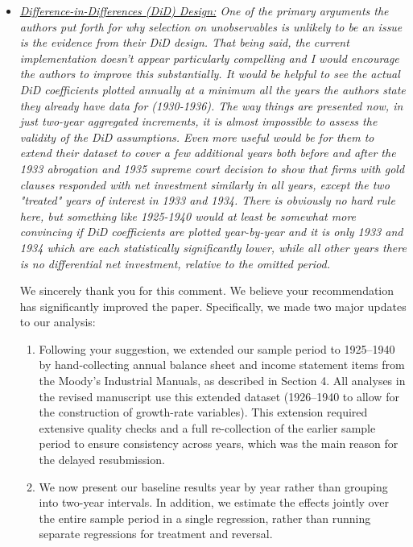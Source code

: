 \begin{itemize}
    \item[\textit{\textcolor{red!60!black}{b.}}] \textit{\textcolor{red!60!black}{
    \underline{Difference-in-Differences (DiD) Design:} 
    One of the primary arguments the authors put forth for why selection on unobservables is unlikely to be an issue is the evidence from their DiD design. That being said, the current implementation doesn't appear particularly compelling and I would encourage the authors to improve this substantially. It would be helpful to see the actual DiD coefficients plotted annually at a minimum all the years the authors state they already have data for (1930-1936). The way things are presented now, in just two-year aggregated increments, it is almost impossible to assess the validity of the DiD assumptions. Even more useful would be for them to extend their dataset to cover a few additional years both before and after the 1933 abrogation and 1935 supreme court decision to show that firms with gold clauses responded with net investment similarly in all years, except the two "treated" years of interest in 1933 and 1934. There is obviously no hard rule here, but something like 1925-1940 would at least be somewhat more convincing if DiD coefficients are plotted year-by-year and it is only 1933 and 1934 which are each statistically significantly lower, while all other years there is no differential net investment, relative to the omitted period.
    }}

    \bigskip

    \noindent We sincerely thank you for this comment. We believe your recommendation has significantly improved the paper. Specifically, we made two major updates to our analysis:

    \begin{enumerate}
    \item Following your suggestion, we extended our sample period to 1925–1940 by hand-collecting annual balance sheet and income statement items from the Moody's Industrial Manuals, as described in Section 4. All analyses in the revised manuscript use this extended dataset (1926–1940 to allow for the construction of growth-rate variables). This extension required extensive quality checks and a full re-collection of the earlier sample period to ensure consistency across years, which was the main reason for the delayed resubmission. 
        
    \item We now present our baseline results year by year rather than grouping into two-year intervals. In addition, we estimate the effects jointly over the entire sample period in a single regression, rather than running separate regressions for treatment and reversal.  
    

\end{enumerate}
\end{itemize}

